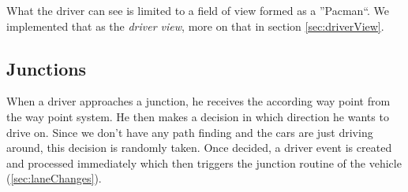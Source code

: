 \noindent What the driver can see is limited to a field of view formed as 
a ''Pacman``. We implemented that as the \emph{driver view}, more on that in 
section \ref{sec:driverView}.

\subsection{Junctions}
\label{sec:driverJunctions}

When a driver approaches a junction, he receives the according way point
from the way point system. He then makes a decision in which direction he
wants to drive on. Since we don't have any path finding and the cars are
just driving around, this decision is randomly taken. Once decided, a
driver event is created and processed immediately which then triggers
the junction routine of the vehicle (\ref{sec:laneChanges}).

